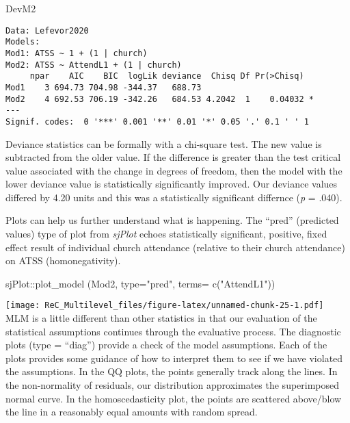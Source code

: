 \documentclass[
  11pt,
]{book}
\newenvironment{Shaded}{\begin{snugshade}}{\end{snugshade}}
\newcommand{\AttributeTok}[1]{\textcolor[rgb]{0.77,0.63,0.00}{#1}}
\newcommand{\FunctionTok}[1]{\textcolor[rgb]{0.00,0.00,0.00}{#1}}
\newcommand{\NormalTok}[1]{#1}
\newcommand{\SpecialCharTok}[1]{\textcolor[rgb]{0.00,0.00,0.00}{#1}}
\newcommand{\StringTok}[1]{\textcolor[rgb]{0.31,0.60,0.02}{#1}}
\begin{document}
\begin{Shaded}
\begin{Highlighting}[]
\NormalTok{DevM2}
\end{Highlighting}
\end{Shaded}

\begin{verbatim}
Data: Lefevor2020
Models:
Mod1: ATSS ~ 1 + (1 | church)
Mod2: ATSS ~ AttendL1 + (1 | church)
     npar    AIC    BIC  logLik deviance  Chisq Df Pr(>Chisq)  
Mod1    3 694.73 704.98 -344.37   688.73                       
Mod2    4 692.53 706.19 -342.26   684.53 4.2042  1    0.04032 *
---
Signif. codes:  0 '***' 0.001 '**' 0.01 '*' 0.05 '.' 0.1 ' ' 1
\end{verbatim}

Deviance statistics can be formally with a chi-square test. The new value is subtracted from the older value. If the difference is greater than the test critical value associated with the change in degrees of freedom, then the model with the lower deviance value is statistically significantly improved. Our deviance values differed by 4.20 units and this was a statistically significant differnce (\emph{p} = .040).

Plots can help us further understand what is happening. The ``pred'' (predicted values) type of plot from \emph{sjPlot} echoes statistically significant, positive, fixed effect result of individual church attendance (relative to their church attendance) on ATSS (homonegativity).

\begin{Shaded}
\begin{Highlighting}[]
\NormalTok{sjPlot}\SpecialCharTok{::}\FunctionTok{plot\_model}\NormalTok{ (Mod2, }\AttributeTok{type=}\StringTok{"pred"}\NormalTok{, }\AttributeTok{terms=} \FunctionTok{c}\NormalTok{(}\StringTok{"AttendL1"}\NormalTok{))}
\end{Highlighting}
\end{Shaded}

\texttt{[image: ReC\_Multilevel\_files/figure-latex/unnamed-chunk-25-1.pdf]}
MLM is a little different than other statistics in that our evaluation of the statistical assumptions continues through the evaluative process. The diagnostic plots (type = ``diag'') provide a check of the model assumptions. Each of the plots provides some guidance of how to interpret them to see if we have violated the assumptions. In the QQ plots, the points generally track along the lines. In the non-normality of residuals, our distribution approximates the superimposed normal curve. In the homoscedasticity plot, the points are scattered above/blow the line in a reasonably equal amounts with random spread.
\end{document}
